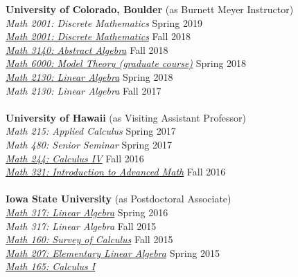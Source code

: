 \pagestyle{fancy} 
 \lfoot{} \rfoot{\thepage} \cfoot{}

\bigskip




\newpage
\pagestyle{fancy} 
 \lfoot{} \rfoot{\thepage} \cfoot{}
\newcommand\cors[2]{\textit{#1: #2}}
\newcommand\crsu[3]{\textit{\href{#3}{#1: #2}}}
\newcommand\semr[1]{\hfill #1\\[\Xpt]}
\noindent \textbf{University of Colorado, Boulder} {\small (as Burnett Meyer Instructor)}\\[2pt]
\cors{Math 2001}
     {Discrete Mathematics}
\semr{Spring 2019}
\crsu{Math 2001}
     {Discrete Mathematics}
     {https://github.com/williamdemeo/math2001-fall2018}
\semr{Fall 2018}
\crsu{Math 3140}
     {Abstract Algebra}
     {https://github.com/williamdemeo/math3140-fall2018}
\semr{Fall 2018}
\crsu{Math 6000}
     {Model Theory (graduate course)}
     {https://github.com/williamdemeo/math6000-spring2018}
\semr{Spring 2018}
\crsu{Math 2130}{Linear Algebra}
     {https://github.com/williamdemeo/math2130-spring2018}
     \semr{Spring 2018}
\cors{Math 2130}{Linear Algebra}
\semr{Fall 2017}\\[-3mm]
\textbf{University of Hawaii} {\small (as Visiting Assistant Professor)}\\[2pt]
\cors{Math 215}{Applied Calculus} \semr{Spring 2017}
\cors{Math 480}{Senior Seminar} \semr{Spring 2017}
\crsu{Math 244}
     {Calculus IV}
     {https://github.com/williamdemeo/math244-fall2016}
\semr{Fall 2016}
\crsu{Math 321}{Introduction to Advanced Math}
     {https://github.com/williamdemeo/math321-fall2016}
\semr{Fall 2016}\\[-3mm]
\textbf{Iowa State University} {\small (as Postdoctoral Associate)}\\[2pt]
\crsu{Math 317}{Linear Algebra}{https://github.com/williamdemeo/Math317-Spring2016}
\semr{Spring 2016}
\cors{Math 317}{Linear Algebra}
\semr{Fall 2015}
\crsu{Math 160}{Survey of Calculus}
     {https://github.com/williamdemeo/Math160-Fall2015}
\semr{Fall 2015}
\crsu{Math 207}{Elementary Linear Algebra}
     {https://github.com/williamdemeo/Math207-Spring2015}
\semr{Spring 2015}
\crsu{Math 165}{Calculus I}
     {https://github.com/williamdemeo/Math165-Spring2015}

